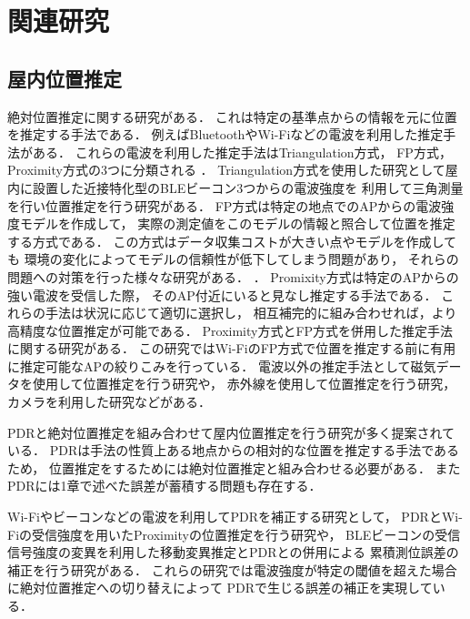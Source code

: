 


\chapter{関連研究}


\section{屋内位置推定}

絶対位置推定に関する研究がある．
これは特定の基準点からの情報を元に位置を推定する手法である．
例えばBluetoothやWi-Fiなどの電波を利用した推定手法がある．
これらの電波を利用した推定手法はTriangulation方式，
FP方式，Proximity方式の3つに分類される
\cite{wireless-lan-summary}．
Triangulation方式を使用した研究として屋内に設置した近接特化型のBLEビーコン3つからの電波強度を
利用して三角測量を行い位置推定を行う研究がある\cite{ble-indoor}\cite{ble-tandem}\cite{triangulation-kalman}．
FP方式は特定の地点でのAPからの電波強度モデルを作成して，
実際の測定値をこのモデルの情報と照合して位置を推定する方式である．
この方式はデータ収集コストが大きい点やモデルを作成しても
環境の変化によってモデルの信頼性が低下してしまう問題があり，
それらの問題への対策を行った様々な研究がある．
\cite{gaussian-mixture-model}
\cite{wireless-lan-cost-reduction}
\cite{fingerprint-auto-update}
\cite{wi-fi-fingerprint-domain}．
Promixity方式は特定のAPからの強い電波を受信した際，
そのAP付近にいると見なし推定する手法である．
これらの手法は状況に応じて適切に選択し，
相互補完的に組み合わせれば，より高精度な位置推定が可能である．
Proximity方式とFP方式を併用した推定手法に関する研究がある\cite{proximity-fingerprint}．
この研究ではWi-FiのFP方式で位置を推定する前に有用に推定可能なAPの絞りこみを行っている．
電波以外の推定手法として磁気データを使用して位置推定を行う研究\cite{pdr-mag}や，
赤外線を使用して位置推定を行う研究\cite{infrared}，カメラを利用した研究\cite{camera}などがある．

PDRと絶対位置推定を組み合わせて屋内位置推定を行う研究が多く提案されている．
PDRは手法の性質上ある地点からの相対的な位置を推定する手法であるため，
位置推定をするためには絶対位置推定と組み合わせる必要がある．
またPDRには1章で述べた誤差が蓄積する問題も存在する．

Wi-Fiやビーコンなどの電波を利用してPDRを補正する研究として，
PDRとWi-Fiの受信強度を用いたProximityの位置推定を行う研究\cite{pdr-wifi}\cite{pdr-rss-fusion}や，
BLEビーコンの受信信号強度の変異を利用した移動変異推定とPDRとの併用による
累積測位誤差の補正を行う研究\cite{pdr-ble}がある．
これらの研究では電波強度が特定の閾値を超えた場合に絶対位置推定への切り替えによって
PDRで生じる誤差の補正を実現している．

